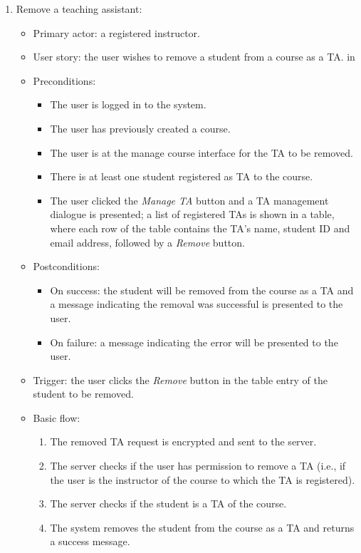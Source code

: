 \begin{enumerate}
\item Remove a teaching assistant:
\begin{itemize}
    \item Primary actor: a registered instructor.
    \item User story: the user wishes to remove a student from a course as a
        TA.
         in
    \item Preconditions:
        \begin{itemize}
            \item The user is logged in to the system.
            \item The user has previously created a course.
            \item The user is at the manage course interface for the TA
                to be removed.
            \item There is at least one student registered as TA to the course.
            \item The user clicked the \emph{Manage TA} button and a TA
                management dialogue is presented; a list of registered TAs
                is shown in a table, where each row of the table contains the TA's
                name, student ID and email address, followed by a \emph{Remove}
                button.
        \end{itemize}
    \item Postconditions:
        \begin{itemize}
            \item On success: the student will be removed from the course
                as a TA and a message indicating the removal was
                successful is presented to the user.
            \item On failure: a message indicating the error will be presented
                to the user.
        \end{itemize}
    \item Trigger: the user clicks the \emph{Remove} button in the table entry
                of the student to be removed.
    \item Basic flow:
        \begin{enumerate}
            \item The removed TA request is encrypted and sent to the server.
            \item The server checks if the user has permission to remove a
                TA (i.e., if the user is the instructor of the course to which
                the TA is registered).
            \item The server checks if the student is a TA of the course.
            \item The system removes the student from the course as a TA
                and returns a success message.
        \end{enumerate}
\end{itemize}

\end{enumerate}

